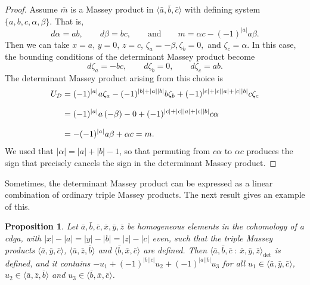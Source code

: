 \documentclass[11pt]{article}
\newtheorem{proposition}[theorem]{Proposition}
\theoremstyle{definition}
\theoremstyle{definition}
\begin{document}
\begin{proof}
    Assume $\overline m$ is a Massey product in $\langle \bar a,\bar b,\bar c\rangle$ with defining system
    $\{a,b,c,\alpha,\beta\}$.
    That is, 
    \begin{equation*}
    d\alpha = ab, \qquad d\beta = bc, \qquad \textrm{and} \qquad m = \alpha c-(-1)^{|a|}a\beta.
    \end{equation*}
    Then we can take $x=a$, $y=0$, $z=c$, $\zeta_a=-\beta, \zeta_b=0,$ and $\zeta_c=\alpha$. 
    In this case, the bounding conditions of the determinant Massey product become
    \begin{equation*}
    d\zeta_a = -bc, \qquad d\zeta_b=0, \qquad d\zeta_c = ab.
    \end{equation*}
    The determinant Massey product arising from this choice is 
    \begin{align*}
     U_{\mathcal D} &= (-1)^{|a|}a\zeta_a -(-1)^{|b|+|a||b|}b\zeta_b + (-1)^{|c|+|c||a|+|c||b|}c\zeta_c \\[0.25cm]
     &= (-1)^{|a|}a\left(-\beta\right) -0 + (-1)^{|c|+|c||a|+|c||b|}c\alpha \\[0.25cm]
     &= -(-1)^{|a|}a\beta +\alpha c = m.
    \end{align*}
We used that $|\alpha|=|a|+|b|-1$, so that permuting from $c\alpha$ to $\alpha c$ produces the sign that 
precisely cancels the sign in the determinant Massey product.
\end{proof}

Sometimes, the determinant Massey product can be expressed as a linear combination of ordinary triple Massey products.
The next result gives an example of this.

\begin{proposition} 
\label{prop: expansion in terms of triple Massey products} 
Let $\bar a,\bar b,\bar c,\bar x,\bar y,\bar z$ be homogeneous elements in the cohomology of a cdga, 
with $|x|-|a|=|y|-|b|=|z|-|c|$ even, 
such that the triple Massey products $\langle \bar a,\bar y,\bar c\rangle$, 
$\langle \bar a,\bar z,\bar b\rangle$ and $\langle \bar b,\bar x,\bar c\rangle$ are defined.
Then $\langle \bar a,\bar b,\bar c \ : \ \bar x,\bar y,\bar z\rangle_{\det}$ is defined,
and it contains $-u_1+(-1)^{|b||c|}u_2+(-1)^{|a||b|}u_3$ for 
all $u_1\in\langle \bar a,\bar y,\bar c\rangle$, 
$u_2\in\langle \bar a,\bar z,\bar b\rangle$ and $u_3\in\langle \bar b,\bar x,\bar c\rangle$. 
\end{proposition}
\end{document}
